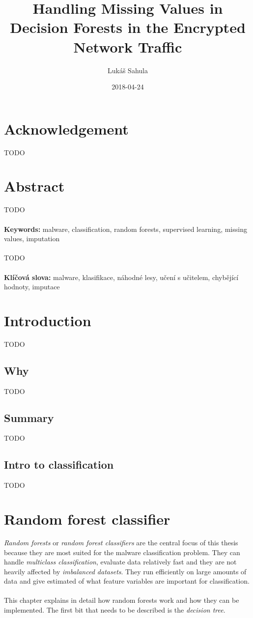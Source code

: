 \documentclass[11pt]{article}
\title{Handling Missing Values in Decision Forests in the Encrypted Network Traffic}
\date{2018-04-24}
\author{Lukáš Sahula}
\begin{document}
  \maketitle
  \newpage
  \section*{Acknowledgement}
    {\color{red}TODO}
  \newpage
  \section*{Abstract}
    {\color{red}TODO}
    \\~\\
    {\bf Keywords:} malware, classification, random forests, supervised learning, missing values, imputation 
    \\~\\
    {\color{red}TODO}
    \\~\\
    {\bf Klíčová slova:} malware, klasifikace, náhodné lesy, učení s učitelem, chybějící hodnoty, imputace 
  \newpage
  \tableofcontents
  \newpage

  \section*{Introduction}
    {\color{red}TODO}
    \subsection{Why}
      {\color{red}TODO}
    \subsection{Summary}
      {\color{red}TODO}
    \subsection{Intro to classification}
      {\color{red}TODO}
  \newpage
  \section{Random forest classifier}
    {\it Random forests} or {\it random forest classifiers} are the central focus of this thesis because they are most suited for the malware classification problem. They can handle {\it multiclass classification}, evaluate data relatively fast and they are not heavily affected by {\it imbalanced datasets}. \citep{brabec} They run efficiently on large amounts of data and give estimated of what feature variables are important for classification. \citep{breiman}
    \\~\\
    This chapter explains in detail how random forests work and how they can be implemented. The first bit that needs to be described is the {\it decision tree}.
\end{document}
